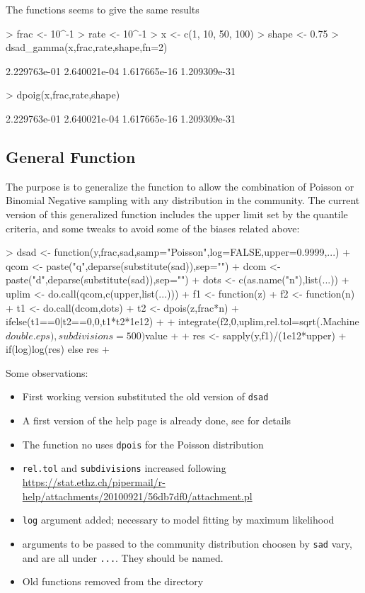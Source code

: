 \documentclass{article}
\newcommand{\code}[1]{\texttt{#1}}
\begin{document}
The functions seems to give the same results

\begin{Schunk}
\begin{Sinput}
> frac <- 10^-1
> rate <- 10^-1
> x <- c(1, 10, 50, 100)
> shape <- 0.75
> dsad_gamma(x,frac,rate,shape,fn=2)
\end{Sinput}
\begin{Soutput}
[1] 2.229763e-01 2.640021e-04 1.617665e-16 1.209309e-31
\end{Soutput}
\begin{Sinput}
> dpoig(x,frac,rate,shape)
\end{Sinput}
\begin{Soutput}
[1] 2.229763e-01 2.640021e-04 1.617665e-16 1.209309e-31
\end{Soutput}
\end{Schunk}

\subsection*{General Function}
The purpose is to generalize the function to allow the combination of Poisson or Binomial Negative sampling with any distribution in the community. The current version of this generalized function includes the upper limit set by the quantile criteria, and some tweaks to avoid some of the biases related above:

\begin{Schunk}
\begin{Sinput}
> dsad <- function(y,frac,sad,samp="Poisson",log=FALSE,upper=0.9999,...){
+   qcom <- paste("q",deparse(substitute(sad)),sep="")
+   dcom <- paste("d",deparse(substitute(sad)),sep="")
+   dots <- c(as.name("n"),list(...))
+   uplim <- do.call(qcom,c(upper,list(...)))
+   f1 <- function(z){
+     f2 <- function(n){
+       t1 <- do.call(dcom,dots)
+       t2 <- dpois(z,frac*n)
+       ifelse(t1==0|t2==0,0,t1*t2*1e12)
+     }
+   integrate(f2,0,uplim,rel.tol=sqrt(.Machine$double.eps),subdivisions=500)$value
+   }
+   res <- sapply(y,f1)/(1e12*upper)
+   if(log)log(res) else res
+ }
\end{Sinput}
\end{Schunk}

Some observations:

\begin{itemize}
\item First working version substituted the old version of \code{dsad}
\item A first version of the help page is already done, see for details
\item The function no uses \code{dpois} for the Poisson distribution
\item \code{rel.tol} and \code{subdivisions} increased following \url{https://stat.ethz.ch/pipermail/r-help/attachments/20100921/56db7df0/attachment.pl}
\item \code{log} argument added; necessary to model fitting by maximum likelihood
\item arguments to be passed to the community distribution choosen by \code{sad} vary, and are all under \code{...}. They should be named.
\item Old functions removed from the directory
\end{itemize}
\end{document}
